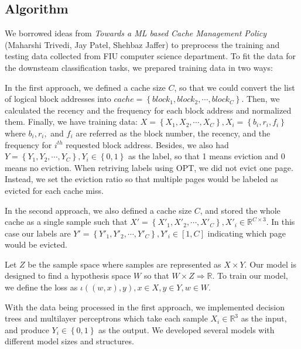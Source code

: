 \documentclass[letterpaper,twocolumn,10pt]{article}
\begin{document}
\subsection{Algorithm}



We borrowed ideas from \textit{Towards a ML based Cache Management Policy} (Maharshi Trivedi, Jay Patel, Shehbaz Jaffer) to preprocess the training and testing data collected from FIU computer science department. To fit the data for the downsteam classification tasks, we prepared training data in two ways:

In the first approach, we defined a cache size $C$, so that we could convert the list of logical block addresses into $cache = \left \{ block_1, block_2,\cdots , block_C \right \}$. Then, we calculated the recency and the frequency for each block address and normalized them. Finally, we have training data: $X = \left \{ X_1, X_2, \cdots, X_C \right \}, X_i = \left \{ b_i, r_i, f_i \right \}$ where $b_i, r_i,$ and $f_i$ are referred as the block number, the recency, and the frequency for $i^{th}$ requested block address. Besides, we also had $Y = \left \{Y_1, Y_2, \cdots, Y_C\right\}, Y_i \in \left \{ 0,1 \right \}$ as the label, so that 1 means eviction and 0 means no eviction. When retriving labels using OPT, we did not evict one page. Instead, we set the eviction ratio so that multiple pages would be labeled as evicted for each cache miss.

In the second approach, we also defined a cache size $C$, and stored the whole cache as a single sample such that ${X}' = \left \{ {{X}'}_1, {{X}'}_2, \cdots, {{X}'}_C \right \}, {{X}'}_i \in \mathbb{R}^{C\times 3}$. In this case our labels are ${Y}' = \left \{{Y}'_1, {Y}'_2, \cdots, {Y}'_C\right\}, {Y}'_i \in [1,C]$ indicating which page would be evicted.


Let $Z$ be the sample space where samples are represented as $X\times Y$. Our model is designed to find a hypothesis space $W$ so that $W\times Z \Rightarrow \mathbb{R}$. To train our model, we define the loss as $\iota\left ( (w,x),y \right ), x\in X, y \in Y, w \in W$.

With the data being processed in the first approach, we implemented decision trees and multilayer perceptrons which take each sample $X_i \in \mathbb{R}^{3}$ as the input, and produce $Y_i \in \left\{0,1\right\}$ as the output. We developed several models with different model sizes and structures.
\end{document}
